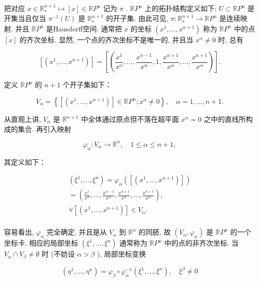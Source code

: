 把对应  $x \in \mathbb{R}_*^{n+1} \mapsto [x] \in \mathbb{R}P^n$  记为  $\pi$ .  $\mathbb{R}P^n$  上的拓扑结构定义如下:  $U \subset \mathbb{R}P^n$  是开集当且仅当  $\pi^{-1}(U)$  是  $\mathbb{R}_*^{n+1}$  的开子集. 由此可见,  $\pi: \mathbb{R}_*^{n+1} \to \mathbb{R}P^n$  是连续映射, 并且  $\mathbb{R}P^n$  是Hausdorff空间. 通常把  $x$  的坐标  $(x^1, \dots, x^{n+1})$  称为  $\mathbb{R}P^n$  中的点  $[x]$  的齐次坐标. 显然, 一个点的齐次坐标不是唯一的, 并且当  $x^\alpha \neq 0$  时, 总有

$$
[ (x ^ {1}, \dots , x ^ {n + 1}) ] = \left[ \left(\frac {x ^ {1}}{x ^ {\alpha}}, \dots , \frac {x ^ {\alpha - 1}}{x ^ {\alpha}}, 1, \frac {x ^ {\alpha + 1}}{x ^ {\alpha}}, \dots , \frac {x ^ {n + 1}}{x ^ {\alpha}}\right) \right].
$$

定义  $\mathbb{R}P^n$  的  $n + 1$  个开子集如下：

$$
V _ {\alpha} = \left\{\left[ \left(x ^ {1}, \dots , x ^ {n + 1}\right) \right] \in \mathbb {R} P ^ {n}; x ^ {\alpha} \neq 0 \right\}, \quad \alpha = 1, \dots , n + 1.
$$

从直观上讲,  $V_{\alpha}$  是  $\mathbb{R}^{n + 1}$  中全体通过原点但不落在超平面  $x^{\alpha} = 0$  之中的直线所构成的集合. 再引入映射

$$
\varphi_ {\alpha}: V _ {\alpha} \rightarrow \mathbb {R} ^ {n}, \quad 1 \leqslant \alpha \leqslant n + 1,
$$

其定义如下：

$$
\begin{array}{l} (\xi^ {1}, \dots , \xi^ {n}) = \varphi_ {\alpha} ([ (x ^ {1}, \dots , x ^ {n + 1}) ]) \\ = \left(\frac {x ^ {1}}{x ^ {\alpha}}, \dots , \frac {x ^ {\alpha - 1}}{x ^ {\alpha}}, \frac {x ^ {\alpha + 1}}{x ^ {\alpha}}, \dots , \frac {x ^ {n + 1}}{x ^ {\alpha}}\right), \\ \forall [ (x ^ {1}, \dots , x ^ {n + 1}) ] \in V _ {\alpha}. \\ \end{array}
$$

容易看出,  $\varphi_{\alpha}$  完全确定, 并且是从  $V_{\alpha}$  到  $\mathbb{R}^{n}$  的同胚. 故  $(V_{\alpha}, \varphi_{\alpha})$  是  $\mathbb{R}P^{n}$  的一个坐标卡, 相应的局部坐标  $(\xi^{1}, \dots, \xi^{n})$  通常称为  $\mathbb{R}P^{n}$  中的点的非齐次坐标. 当  $V_{\alpha} \cap V_{\beta} \neq \emptyset$  时 (不妨设  $\alpha > \beta$ ), 局部坐标变换

$$
(\eta^ {1}, \dots , \eta^ {n}) = \varphi_ {\beta} \circ \varphi_ {\alpha} ^ {- 1} (\xi^ {1}, \dots , \xi^ {n}), \quad \xi^ {\beta} \neq 0
$$

